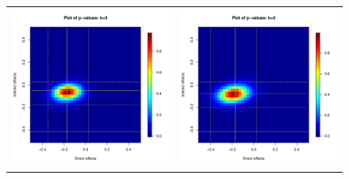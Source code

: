\documentclass[12pt]{article}
\begin{document}
\begin{figure}
	\centering
	\begin{tabular}{cc}
	\includegraphics[scale=0.45]{./images/pval_plot_coppock_ideo_3nn_raw.pdf} &
	\includegraphics[scale=0.45]{./images/pval_plot_coppock_ideo_5nn_raw.pdf} \\ 

\end{tabular}
\end{figure}
\end{document}

